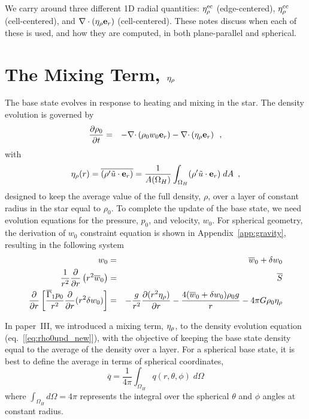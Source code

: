We carry around three different 1D radial quantities: $\eta_{\rho}^{\rm ec}$
(edge-centered), $\eta_{\rho}^{\rm cc}$ (cell-centered), and $\nabla\cdot(\eta_{\rho}{\bf e}_r)$
(cell-centered).  These notes discuss when each of these is used, and
how they are computed, in both plane-parallel and spherical.

\section{The Mixing Term, $\eta_{\rho}$}

The base state evolves in response to heating and mixing in the star.
The density evolution is governed by
\begin{eqnarray}
\frac{\partial \rho_0}{\partial t} &=& - 
 \mathbf{\nabla} \mathbf{\cdot} \left( \rho_0 w_0 \mathbf{e}_r \right)
- \mathbf{\nabla} \mathbf{\cdot} \left( \eta_{\rho} \mathbf{e}_r \right) \enskip ,
\label{eq:rho0upd_new}
\end{eqnarray}
with
\begin{equation}
\eta_{\rho}(r) = \overline{\left({\rho^{\prime}} \tilde{u} \cdot \mathbf{e}_r \right)} = \frac{1}{A(\Omega_H)} 
 \int_{\Omega_H}  ({\rho^{\prime}} \tilde{u} \cdot \mathbf{e}_r ) \; dA \enskip , \label{eq:eta}
\end{equation}
designed to keep the average value of the full density, $\rho$, over a
layer of constant radius in the star equal to $\rho_0$.  To complete
the update of the base state, we need evolution equations for the
pressure, $p_0$, and velocity, $w_0$.  For spherical geometry, the
derivation of $w_0$ constraint equation is shown in
Appendix~\ref{app:gravity}, resulting in the following system
\begin{eqnarray}
w_0 &=& \overline{w}_0 + \delta w_0 \\
\frac{1}{r^2} \frac{\partial}{\partial r} \left (r^2 \overline{w}_0 \right ) &=& \overline{S} \\
\frac{\partial}{\partial r} \left[ \frac{\overline{\Gamma}_1 p_0}{r^2} \frac{\partial}{\partial r} (r^2 \delta w_0) \right] &=& - \frac{g}{r^2} \frac{\partial (r^2 \eta_{\rho})}{\partial r} - \frac{4 (\overline{w}_0 + \delta w_0) \rho_0 g}{r} 
- 4 \pi G \rho_0 \eta_{\rho} \label{eq:dw0constraint}
\end{eqnarray}

In paper~III, we introduced a mixing term, $\eta_{\rho}$, to the density
evolution equation (eq.~[\ref{eq:rho0upd_new}]), with the objective of
keeping the base state density equal to the average of the density
over a layer.  For a spherical base state, it is best to define the 
average in terms of spherical coordinates,
\begin{equation}
\overline{q} = \frac{1}{4\pi} \int_{\Omega_H} q(r,\theta,\phi) \; d\Omega
\end{equation}
where $\int_{\Omega_H} d\Omega = 4\pi$ represents the integral over
the spherical $\theta$ and $\phi$ angles at constant radius.

